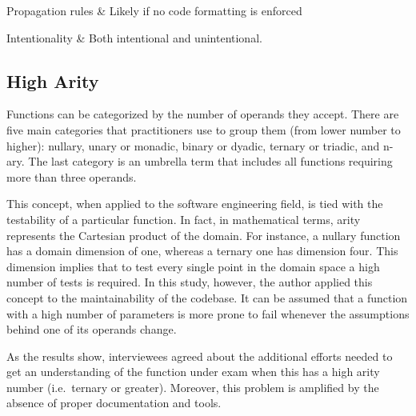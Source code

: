 \begin{table}[!htbp]
\begin{tabu}
			
			
			Propagation rules & Likely if no code formatting is enforced\\
			\hline
			
			Intentionality & Both intentional and unintentional. \\
			\hline 	 	
			
		\end{tabu}
		\label{tab:res-complex-statements}
		\caption[Complex statements TD item specification]{Complex statements Technical Debt item specification according to guidelines proposed by \cite{mapping_study_td}.}
	\end{table}
	
	
	\subsection{High Arity}
	
    Functions can be categorized by the number of operands they accept. There are five main categories that practitioners use to group them (from lower number to higher): nullary, unary or monadic, binary or dyadic, ternary or triadic, and n-ary. The last category is an umbrella term that includes all functions requiring more than three operands.
    
    This concept, when applied to the software engineering field, is tied with the testability of a particular function. In fact, in mathematical terms, arity represents the Cartesian product of the domain. For instance, a nullary function has a domain dimension of one, whereas a ternary one has dimension four. This dimension implies that to test every single point in the domain space a high number of tests is required. In this study, however, the author applied this concept to the maintainability of the codebase. It can be assumed that a function with a high number of parameters is more prone to fail whenever the assumptions behind one of its operands change. 
    
    As the results show, interviewees agreed about the additional efforts needed to get an understanding of the function under exam when this has a high arity number (i.e.\ ternary or greater). Moreover, this problem is amplified by the absence of proper documentation and tools. 
    
